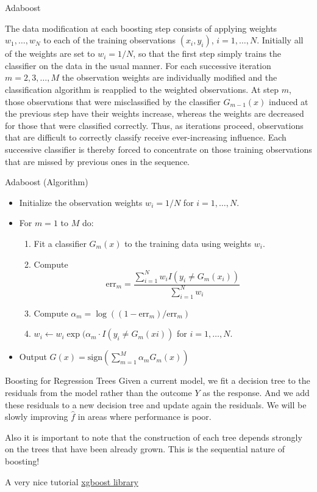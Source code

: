 \documentclass{beamer}
\begin{document}
\begin{frame}{Adaboost}
	
	The data modification at each boosting step consists of applying weights $w_1,\ldots, w_N$ to each of the training observations $(x_i,y_i)$, $i=1,\ldots, N$. Initially all of the weights are set to $w_i = 1/N$, so that the first step simply trains the classifier on the data in the usual manner. For each successive iteration $m=2,3, \ldots, M$ the observation weights are individually modified and the classification algorithm is reapplied to the weighted observations. At step $m$, those observations that were misclassified by the classifier $G_{m-1}(x)$ induced at the previous step have their weights increase, whereas the weights are decreased for those that were classified correctly. Thus, as iterations proceed, observations that are difficult to correctly classify receive ever-increasing influence. Each successive classifier is thereby forced to concentrate on those training observations that are missed by previous ones in the sequence. 
	
\end{frame}
\begin{frame}{Adaboost (Algorithm)}
	\begin{itemize}
		\item Initialize the observation weights $w_i=1/N$ for $i=1,\ldots, N$.
		\item For $m=1$ to $M$ do:
		\begin{enumerate}
			\item Fit a classifier $G_m(x)$ to the training data using weights $w_i$.
			\item Compute
			\begin{equation*}
				\text{err}_m = \frac{\sum_{i=1}^N w_i I(y_i\ne G_m(x_i))}{\sum_{i=1}^{N}w_i}
			\end{equation*}
			\item Compute $\alpha_m = \log((1- \text{err}_m)/\text{err}_m)$
			\item $w_i \leftarrow w_i \exp( \alpha_m \cdot I (y_i \ne G_m(xi))$ for $i=1, \ldots, N$.
		\end{enumerate}
	\item Output $G(x)= \text{sign} \left(\sum_{m=1}^M\alpha_m G_m(x)\right)$
	\end{itemize}
\end{frame}

\begin{frame}{Boosting for Regression Trees}
	Given a current model, we fit a decision tree to the residuals from the model rather than the outcome $Y$ as the response. And we add these residuals to a new decision tree and update again the residuals.  We will be slowly improving $\hat{f}$ in areas where performance is poor.
	
	Also it is important to note that the construction of each tree depends strongly on the trees that have been already grown. This is the sequential nature of boosting!
	
	A very nice tutorial 
	\href{https://xgboost.readthedocs.io/en/latest/tutorials/model.html}{xgboost library}
	
	 \end{frame}
\end{document}
